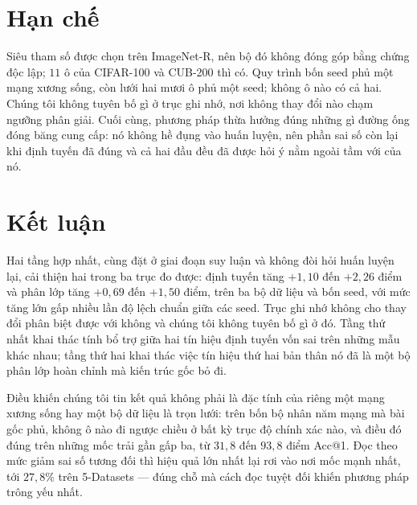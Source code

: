\documentclass[runningheads]{llncs}
\begin{document}
\section{Hạn chế}
\label{sec:limits}

Siêu tham số được chọn trên ImageNet-R, nên bộ đó không đóng góp bằng chứng độc
lập; $11$ ô của CIFAR-100 và CUB-200 thì có. Quy trình bốn seed phủ một mạng
xương sống, còn lưới hai mươi ô phủ một seed; không ô nào có cả hai. Chúng tôi
không tuyên bố gì ở trục ghi nhớ, nơi không thay đổi nào chạm ngưỡng phân giải.
Cuối cùng, phương pháp thừa hưởng đúng những gì đường ống đóng băng cung cấp: nó
không hề đụng vào huấn luyện, nên phần sai số còn lại khi định tuyến đã đúng và
cả hai đầu đều đã được hỏi ý nằm ngoài tầm với của nó.

\section{Kết luận}

Hai tầng hợp nhất, cùng đặt ở giai đoạn suy luận và không đòi hỏi huấn luyện
lại, cải thiện hai trong ba trục đo được: định tuyến tăng $+1{,}10$ đến $+2{,}26$
điểm và phân lớp tăng $+0{,}69$ đến $+1{,}50$ điểm, trên ba bộ dữ liệu và bốn
seed, với mức tăng lớn gấp nhiều lần độ lệch chuẩn giữa các seed. Trục ghi nhớ
không cho thay đổi phân biệt được với không và chúng tôi không tuyên bố gì ở đó.
Tầng thứ nhất khai thác tính bổ trợ giữa hai tín hiệu định tuyến vốn sai trên
những mẫu khác nhau; tầng thứ hai khai thác việc tín hiệu thứ hai bản thân nó đã
là một bộ phân lớp hoàn chỉnh mà kiến trúc gốc bỏ đi.

Điều khiến chúng tôi tin kết quả không phải là đặc tính của riêng một mạng xương
sống hay một bộ dữ liệu là trọn lưới: trên bốn bộ nhân năm mạng mà bài gốc phủ,
không ô nào đi ngược chiều ở bất kỳ trục độ chính xác nào, và điều đó đúng trên
những mốc trải gần gấp ba, từ $31{,}8$ đến $93{,}8$ điểm Acc@1. Đọc theo mức giảm
sai số tương đối thì hiệu quả lớn nhất lại rơi vào nơi mốc mạnh nhất, tới
$27{,}8\%$ trên 5-Datasets --- đúng chỗ mà cách đọc tuyệt đối khiến phương pháp
trông yếu nhất.
\end{document}
